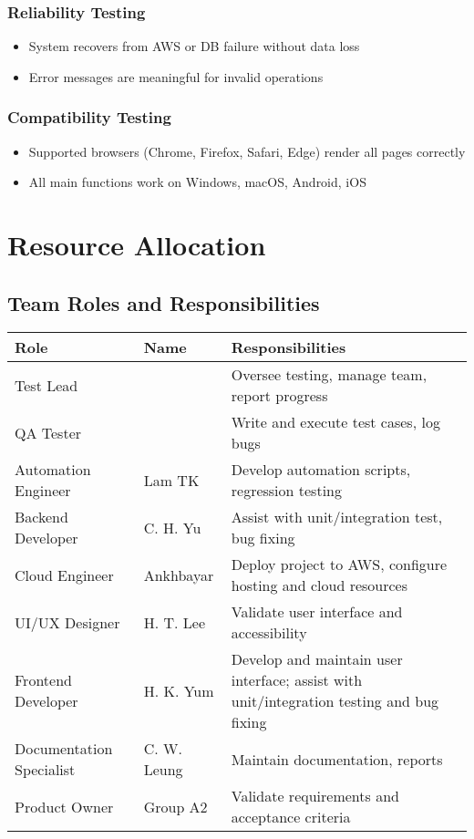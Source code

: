 \documentclass[a4paper,11pt]{scrartcl}
\begin{document}
\subsubsection{Reliability Testing}
\begin{itemize}[leftmargin=*]
    \item System recovers from AWS or DB failure without data loss
    \item Error messages are meaningful for invalid operations
\end{itemize}

\subsubsection{Compatibility Testing}
\begin{itemize}[leftmargin=*]
    \item Supported browsers (Chrome, Firefox, Safari, Edge) render all pages correctly
    \item All main functions work on Windows, macOS, Android, iOS
\end{itemize}

\section{Resource Allocation}

\subsection{Team Roles and Responsibilities}
\begin{tabularx}{\textwidth}{l l X}
\toprule
Role & Name & Responsibilities \\
\midrule
Test Lead & & Oversee testing, manage team, report progress \\
QA Tester &  & Write and execute test cases, log bugs \\
Automation Engineer & Lam TK & Develop automation scripts, regression testing \\
Backend Developer & C. H. Yu & Assist with unit/integration test, bug fixing \\
Cloud Engineer & Ankhbayar & Deploy project to AWS, configure hosting and cloud resources \\
UI/UX Designer & H. T. Lee & Validate user interface and accessibility \\
Frontend Developer & H. K. Yum & Develop and maintain user interface; assist with unit/integration testing and bug fixing \\
Documentation Specialist & C. W. Leung & Maintain documentation, reports \\
Product Owner & Group A2 & Validate requirements and acceptance criteria \\
\bottomrule
\end{tabularx}
\end{document}
